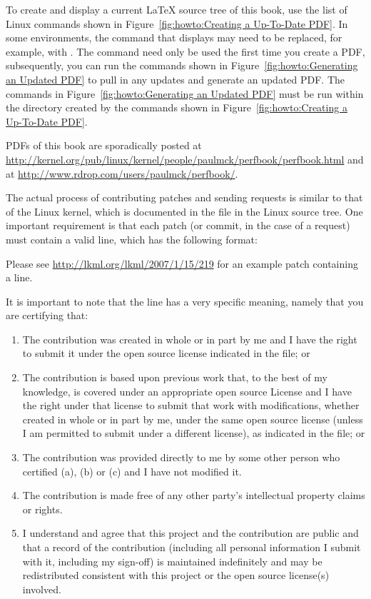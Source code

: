To create and display a current \LaTeX{} source tree of this book,
use the list of Linux commands shown in
Figure~\ref{fig:howto:Creating a Up-To-Date PDF}.
In some environments, the  command that displays 
may need to be replaced, for example, with .
The  command need only be used the first time you
create a PDF, subsequently, you can run the commands shown in
Figure~\ref{fig:howto:Generating an Updated PDF} to pull in any updates
and generate an updated PDF.
The commands in
Figure~\ref{fig:howto:Generating an Updated PDF}
must be run within the  directory created by the commands
shown in
Figure~\ref{fig:howto:Creating a Up-To-Date PDF}.

PDFs of this book are sporadically posted at
\url{http://kernel.org/pub/linux/kernel/people/paulmck/perfbook/perfbook.html}
and at
\url{http://www.rdrop.com/users/paulmck/perfbook/}.

The actual process of contributing patches and sending 
requests is similar to that of the Linux kernel, which is documented
in the  file in the Linux source tree.
One important requirement is that each patch (or commit, in the case
of a  request) must contain a valid  line,
which has the following format:

\begin{quote}
	{ \scriptsize
	}
\end{quote}

Please see \url{http://lkml.org/lkml/2007/1/15/219} for an example
patch containing a  line.

It is important to note that the  line has
a very specific meaning, namely that you are certifying that:

\begin{enumerate}
\item	The contribution was created in whole or in part
	by me and I have the right to submit it under
	the open source license indicated in the file; or
\item	The contribution is based upon previous work
	that, to the best of my knowledge, is covered
	under an appropriate open source License and I
	have the right under that license to submit that
	work with modifications, whether created in whole
	or in part by me, under the same open source
	license (unless I am permitted to submit under
	a different license), as indicated in the file; or
\item	The contribution was provided directly to me by
	some other person who certified (a), (b) or (c)
	and I have not modified it.
\item	The contribution is made free of any other party's
	intellectual property claims or rights.
\item	I understand and agree that this project and the
	contribution are public and that a record of the
	contribution (including all personal information
	I submit with it, including my sign-off) is
	maintained indefinitely and may be redistributed
	consistent with this project or the open source
	license(s) involved.
\end{enumerate}

